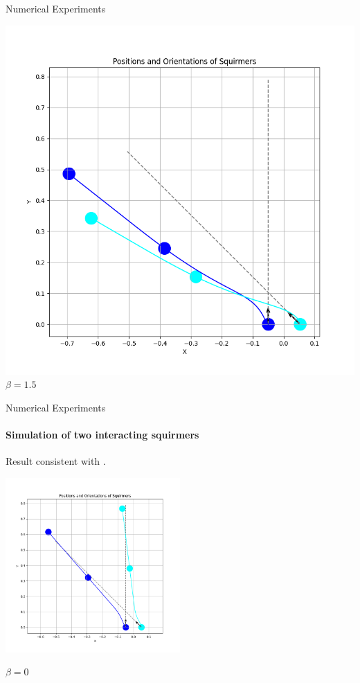 \documentclass{beamer}
\begin{document}
\begin{frame}{Numerical Experiments}
\begin{minipage}{0.49\textwidth}
        \includegraphics[width=1\textwidth]{../../graphs/simulations/sim_sq_sq/beta1_5/3pi_4_.png}
        $\beta = 1.5$
    \end{minipage}
\end{frame}

\begin{frame}{Numerical Experiments}
    \framesubtitle{Simulation of two interacting squirmers}
    \begin{center}
        Result consistent with \cite{Stark}.
    \end{center}
    \centering
    \includegraphics[width=0.5\textwidth]{../../graphs/simulations/sim_sq_sq/beta0/3pi_4_.png}
    \begin{center}
        $\beta = 0$
    \end{center}
\end{frame}
\end{document}
